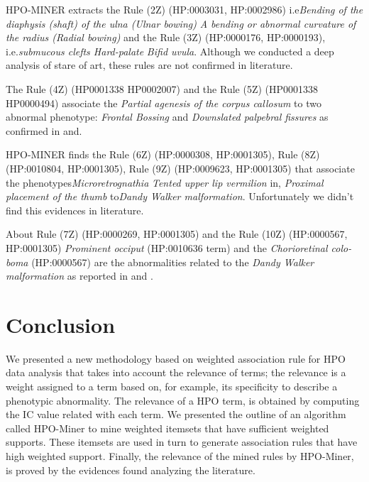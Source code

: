 \documentclass{article}
\theoremstyle{definition}
\begin{document}
HPO-MINER extracts the Rule (2Z) (HP:0003031, HP:0002986) i.e\textit{Bending of the diaphysis (shaft) of the ulna (Ulnar bowing)}  \textit{A bending or abnormal curvature of the radius (Radial bowing)} and the Rule (3Z) (HP:0000176, HP:0000193), i.e.\textit{submucous clefts Hard-palate	} \textit{Bifid uvula}. Although we conducted a deep analysis of stare of art, these rules are not confirmed in literature.

The Rule (4Z) (HP0001338 HP0002007) and the Rule (5Z) (HP0001338 HP0000494) associate the \textit{Partial agenesis of the corpus callosum} to two abnormal phenotype: \textit{Frontal Bossing} and \textit{Downslated palpebral fissures} as confirmed in \cite{taylor1968nevoid} and\cite{gelman1991further}.



HPO-MINER finds the Rule (6Z) (HP:0000308, HP:0001305), Rule (8Z) (HP:0010804, HP:0001305), Rule (9Z) (HP:0009623, HP:0001305) that associate the phenotypes\textit{Microretrognathia} \textit{Tented upper lip vermilion} in, \textit{Proximal placement of the thumb}  to\textit{Dandy Walker malformation}. Unfortunately we didn't find this evidences in literature.

About Rule (7Z) (HP:0000269, HP:0001305) and the Rule (10Z) (HP:0000567, HP:0001305) \textit{Prominent occiput} (HP:0010636 term) and the  \textit{Chorioretinal colo- ~ boma} (HP:0000567) are the abnormalities related to the \textit{Dandy Walker malformation} as reported in \cite{archer1978enlarged} and \cite{dobyns1989diagnostic}.






\section{Conclusion}
\label{sec:conclusion}
We presented a new methodology based on weighted association rule for HPO data analysis that takes into account the relevance of terms;  the relevance is a weight assigned to a term based on, for example, its specificity to describe a phenotypic abnormality. The relevance of a HPO term, is obtained by computing the IC value related with each term. We presented the outline of an algorithm called HPO-Miner to mine weighted itemsets that have sufficient weighted supports. These itemsets are used in turn to generate association rules that have high weighted support. Finally, the relevance of the mined rules by HPO-Miner, is proved by the evidences found analyzing the literature.
\end{document}
